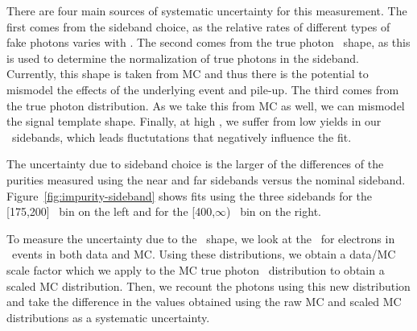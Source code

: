 
There are four main sources of systematic uncertainty for this measurement. 
The first comes from the sideband choice, as the relative rates of different types of fake photons varies with \ICH. 
The second comes from the true photon \ICH\ shape, as this is used to determine the normalization of true photons in the sideband. 
Currently, this shape is taken from MC and thus there is the potential to mismodel the effects of the underlying event and pile-up. 
The third comes from the true photon \sieie distribution. 
As we take this from MC as well, we can mismodel the signal template shape. 
Finally, at high \pt, we suffer from low yields in our \ICH\ sidebands, which leads fluctutations that negatively influence the fit.

The uncertainty due to sideband choice is the larger of the differences of the purities measured using the near and far sidebands versus the nominal sideband. 
Figure~\ref{fig:impurity-sideband} shows fits using the three sidebands for the [175,200] \pt\ bin on the left and for the [400,$\infty$) \pt\ bin on the right.

To measure the uncertainty due to the \ICH\ shape, we look at the \ICH\ for electrons in \Zee\ events in both data and MC. 
Using these distributions, we obtain a data/MC scale factor which we apply to the MC true photon \ICH\ distribution to obtain a scaled MC distribution. 
Then, we recount the photons using this new distribution and take the difference in the values obtained using the raw MC and scaled MC distributions as a systematic uncertainty.

